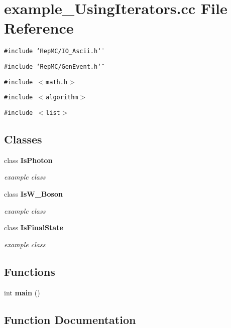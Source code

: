 \section{example\_\-Using\-Iterators.cc File Reference}
\label{example__UsingIterators_8cc}
{\tt \#include \char`\"{}Hep\-MC/IO\_\-Ascii.h\char`\"{}}\par
{\tt \#include \char`\"{}Hep\-MC/Gen\-Event.h\char`\"{}}\par
{\tt \#include $<$math.h$>$}\par
{\tt \#include $<$algorithm$>$}\par
{\tt \#include $<$list$>$}\par
\subsection*{Classes}
\begin{CompactItemize}
\item 
class {\bf Is\-Photon}
\begin{CompactList}\small\item\em example class \item\end{CompactList}\item 
class {\bf Is\-W\_\-Boson}
\begin{CompactList}\small\item\em example class \item\end{CompactList}\item 
class {\bf Is\-Final\-State}
\begin{CompactList}\small\item\em example class \item\end{CompactList}\end{CompactItemize}
\subsection*{Functions}
\begin{CompactItemize}
\item 
int {\bf main} ()
\end{CompactItemize}


\subsection{Function Documentation}
